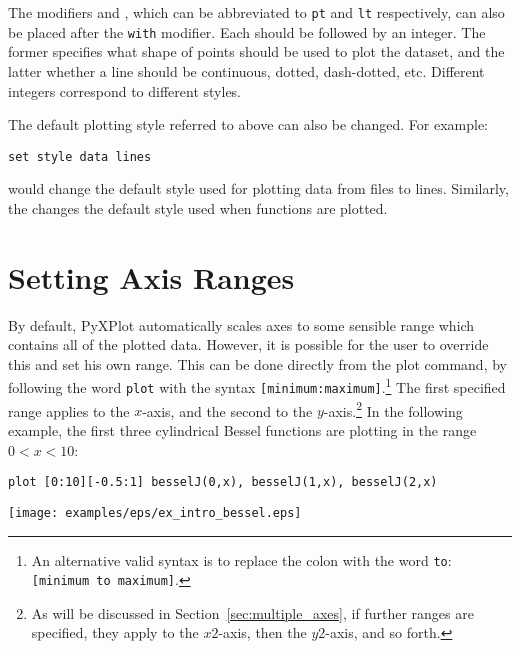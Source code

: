 \label{sec:pointtype}
The modifiers  and , which can be
abbreviated to {\tt pt} and {\tt lt} respectively, can also be placed after the
{\tt with} modifier. Each should be followed by an integer.  The former
specifies what shape of points should be used to plot the dataset, and the
latter whether a line should be continuous, dotted, dash-dotted, etc.
Different integers correspond to different styles.

The default plotting style referred to above can also be changed.  For example:

\begin{verbatim}
set style data lines
\end{verbatim}

\noindent would change the default style used for plotting data from files to
lines. Similarly, the  changes the default style
used when functions are plotted.


\section{Setting Axis Ranges}
\label{sec:plot_ranges}

By default, PyXPlot automatically scales axes to some sensible range which
contains all of the plotted data. However, it is possible for the user to
override this and set his own range. This can be
done directly from the plot command, by following the word {\tt plot} with the
syntax {\tt [minimum:maximum]}.\footnote{An alternative valid syntax is to
replace the colon with the word {\tt to}: {\tt [minimum to maximum]}.} The
first specified range applies to the $x$-axis, and the second to the
$y$-axis.\footnote{As will be discussed in Section~\ref{sec:multiple_axes}, if
further ranges are specified, they apply to the $x2$-axis, then the $y2$-axis,
and so forth.} In the following example, the first three cylindrical Bessel
functions are plotting in the range $0<x<10$:

\begin{verbatim}
plot [0:10][-0.5:1] besselJ(0,x), besselJ(1,x), besselJ(2,x)
\end{verbatim}
\begin{center}
\texttt{[image: examples/eps/ex\_intro\_bessel.eps]}
\end{center}

